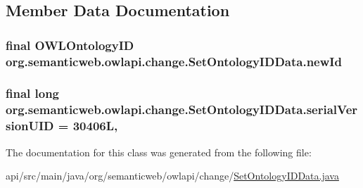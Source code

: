 \subsection{Member Data Documentation}
\hypertarget{classorg_1_1semanticweb_1_1owlapi_1_1change_1_1_set_ontology_i_d_data_acbb6b0c41d0a5dfe7a7ae7388dd25f49}{
\subsubsection[{new\-Id}]{\setlength{\rightskip}{0pt plus 5cm}final {\bf O\-W\-L\-Ontology\-I\-D} org.\-semanticweb.\-owlapi.\-change.\-Set\-Ontology\-I\-D\-Data.\-new\-Id\hspace{0.3cm}{\ttfamily [private]}}}\label{classorg_1_1semanticweb_1_1owlapi_1_1change_1_1_set_ontology_i_d_data_acbb6b0c41d0a5dfe7a7ae7388dd25f49}
\hypertarget{classorg_1_1semanticweb_1_1owlapi_1_1change_1_1_set_ontology_i_d_data_a08d57f749a102e283cbb1ce1d4a122fa}{
\subsubsection[{serial\-Version\-U\-I\-D}]{\setlength{\rightskip}{0pt plus 5cm}final long org.\-semanticweb.\-owlapi.\-change.\-Set\-Ontology\-I\-D\-Data.\-serial\-Version\-U\-I\-D = 30406\-L\hspace{0.3cm}{\ttfamily [static]}, {\ttfamily [private]}}}\label{classorg_1_1semanticweb_1_1owlapi_1_1change_1_1_set_ontology_i_d_data_a08d57f749a102e283cbb1ce1d4a122fa}


The documentation for this class was generated from the following file\-:\begin{DoxyCompactItemize}
\item 
api/src/main/java/org/semanticweb/owlapi/change/\hyperlink{_set_ontology_i_d_data_8java}{Set\-Ontology\-I\-D\-Data.\-java}\end{DoxyCompactItemize}
